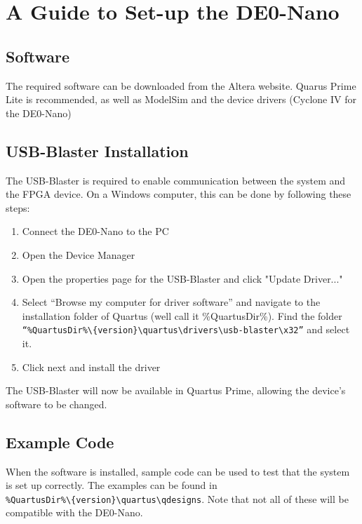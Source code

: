 \chapter{A Guide to Set-up the DE0-Nano}

\section{Software}
The required software can be downloaded from the Altera website. Quarus Prime Lite is recommended, as well as ModelSim and the device drivers (Cyclone IV for the DE0-Nano) \cite{QuartusDownloadPage}

\section{USB-Blaster Installation}
The USB-Blaster is required to enable communication between the system and the FPGA device. On a Windows computer, this can be done by following these steps:

\begin{enumerate}
	\item Connect the DE0-Nano to the PC
	\item Open the Device Manager
	\item Open the properties page for the USB-Blaster and click "Update Driver..."
	\item Select “Browse my computer for driver software” and navigate to the installation folder of Quartus (we\textsc{}ll call it \%QuartusDir\%). Find the folder \texttt{“\%QuartusDir\%\textbackslash\{version\}\textbackslash quartus\textbackslash drivers\textbackslash usb-blaster\textbackslash x32”} and select it.
	\item Click next and install the driver	
\end{enumerate}

The USB-Blaster will now be available in Quartus Prime, allowing the device's software to be changed.

\section{Example Code}
When the software is installed, sample code can be used to test that the system is set up correctly. The examples can be found in \\ \texttt{\%QuartusDir\%\textbackslash\{version\}\textbackslash quartus\textbackslash qdesigns}. Note that not all of these will be compatible with the DE0-Nano.

